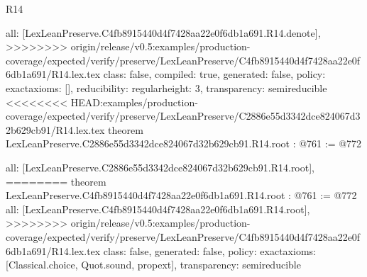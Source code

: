 \begin{lexlean}{R14}
\begin{coremodule}
{{{{{{{{{{{{  all: [LexLeanPreserve.C4fb8915440d4f7428aa22e0f6db1a691.R14.denote],
>>>>>>>> origin/release/v0.5:examples/production-coverage/expected/verify/preserve/LexLeanPreserve/C4fb8915440d4f7428aa22e0f6db1a691/R14.lex.tex
  class: false,
  compiled: true,
  generated: false,
  policy: exact{axioms: []},
  reducibility: regular{height: 3},
  transparency: semireducible
}
<<<<<<<< HEAD:examples/production-coverage/expected/verify/preserve/LexLeanPreserve/C2886e55d3342dce824067d32b629cb91/R14.lex.tex
theorem LexLeanPreserve.C2886e55d3342dce824067d32b629cb91.R14.root : @761 := @772 {
  all: [LexLeanPreserve.C2886e55d3342dce824067d32b629cb91.R14.root],
========
theorem LexLeanPreserve.C4fb8915440d4f7428aa22e0f6db1a691.R14.root : @761 := @772 {
  all: [LexLeanPreserve.C4fb8915440d4f7428aa22e0f6db1a691.R14.root],
>>>>>>>> origin/release/v0.5:examples/production-coverage/expected/verify/preserve/LexLeanPreserve/C4fb8915440d4f7428aa22e0f6db1a691/R14.lex.tex
  class: false,
  generated: false,
  policy: exact{axioms: [Classical.choice, Quot.sound, propext]},
  transparency: semireducible
}

}}}}}}}}}}}}
\end{coremodule}
\end{lexlean}
